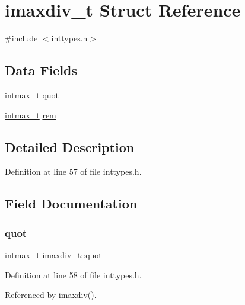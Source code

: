\hypertarget{structimaxdiv__t}{}\section{imaxdiv\+\_\+t Struct Reference}
\label{structimaxdiv__t}


{\ttfamily \#include $<$inttypes.\+h$>$}

\subsection*{Data Fields}
\begin{DoxyCompactItemize}
\item 
\mbox{\hyperlink{stdint_8h_a036cd61bb4b30bb510b9538af4cebd1d}{intmax\+\_\+t}} \mbox{\hyperlink{structimaxdiv__t_a9339814cbb7610c72fb7d30c6573b393}{quot}}
\item 
\mbox{\hyperlink{stdint_8h_a036cd61bb4b30bb510b9538af4cebd1d}{intmax\+\_\+t}} \mbox{\hyperlink{structimaxdiv__t_a6c9701ad10bff81edae7ff679cae7850}{rem}}
\end{DoxyCompactItemize}


\subsection{Detailed Description}


Definition at line 57 of file inttypes.\+h.



\subsection{Field Documentation}
\mbox{\label{structimaxdiv__t_a9339814cbb7610c72fb7d30c6573b393}} 
\subsubsection{\texorpdfstring{quot}{quot}}
{\footnotesize\ttfamily \mbox{\hyperlink{stdint_8h_a036cd61bb4b30bb510b9538af4cebd1d}{intmax\+\_\+t}} imaxdiv\+\_\+t\+::quot}



Definition at line 58 of file inttypes.\+h.



Referenced by imaxdiv().

\mbox{\label{structimaxdiv__t_a6c9701ad10bff81edae7ff679cae7850}} 
